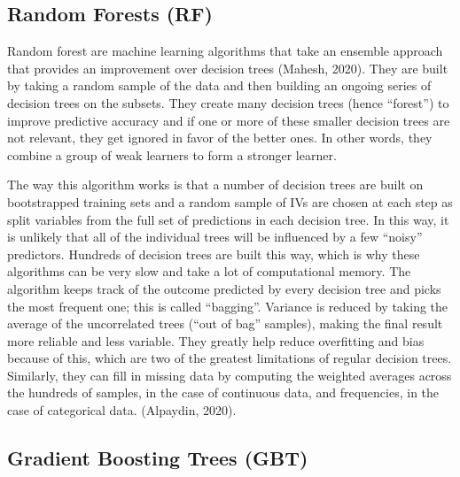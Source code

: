 \documentclass[
  man]{apa7}
\begin{document}
\subsection{Random Forests (RF)}\label{random-forests-rf}

Random forest are machine learning algorithms that take an ensemble approach that provides an improvement over decision trees (Mahesh, 2020).
They are built by taking a random sample of the data and then building an ongoing series of decision trees on the subsets.
They create many decision trees (hence ``forest'') to improve predictive accuracy and if one or more of these smaller decision trees are not relevant, they get ignored in favor of the better ones.
In other words, they combine a group of weak learners to form a stronger learner.

The way this algorithm works is that a number of decision trees are built on bootstrapped training sets and a random sample of IVs are chosen at each step as split variables from the full set of predictions in each decision tree.
In this way, it is unlikely that all of the individual trees will be influenced by a few ``noisy'' predictors.
Hundreds of decision trees are built this way, which is why these algorithms can be very slow and take a lot of computational memory.
The algorithm keeps track of the outcome predicted by every decision tree and picks the most frequent one; this is called ``bagging''.
Variance is reduced by taking the average of the uncorrelated trees (``out of bag'' samples), making the final result more reliable and less variable.
They greatly help reduce overfitting and bias because of this, which are two of the greatest limitations of regular decision trees.
Similarly, they can fill in missing data by computing the weighted averages across the hundreds of samples, in the case of continuous data, and frequencies, in the case of categorical data.
(Alpaydin, 2020).

\subsection{Gradient Boosting Trees (GBT)}\label{gradient-boosting-trees-gbt}
\end{document}
